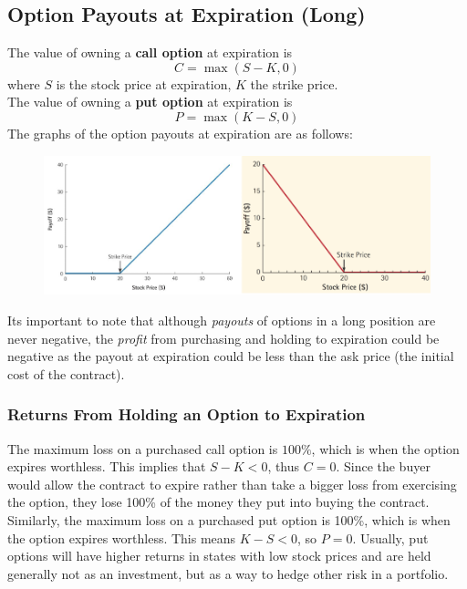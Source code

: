 \documentclass[11pt]{article}
\theoremstyle{definition}
\begin{document}
\subsection{Option Payouts at Expiration (Long)}
The value of owning a \textbf{call option} at expiration is 
\begin{equation*}
    C = \max(S - K, 0)
\end{equation*}
where $S$ is the stock price at expiration, $K$ the strike price.\\
The value of owning a \textbf{put option} at expiration is 
\begin{equation*}
    P = \max(K - S, 0)
\end{equation*}
The graphs of the option payouts at expiration are as follows:
\begin{figure}[h]
    \centering
    \includegraphics[scale=0.4]{Screenshot 2023-12-12 at 01.17.29.png}
\end{figure}

Its important to note that although \textit{payouts} of options in a long position are never negative, the \textit{profit} from purchasing and holding to expiration could be negative as the payout at expiration could be less than the ask price (the initial cost of the contract).

\subsubsection{Returns From Holding an Option to Expiration}
The maximum loss on a purchased call option is $100\%$, which is when the option expires worthless. This implies that $S - K < 0$, thus $C =0$. Since the buyer would allow the contract to expire rather than take a bigger loss from exercising the option, they lose 100\% of the money they put into buying the contract.\\
Similarly, the maximum loss on a purchased put option is 100\%, which is when the option expires worthless. This means $K - S < 0$, so $P = 0$. Usually, put options will have higher returns in states with low stock prices and are held generally not as an investment, but as a way to hedge other risk in a portfolio.
\end{document}
